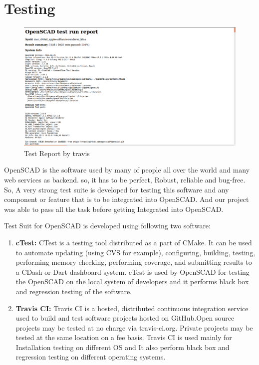 \section{Testing}
\begin{figure}[H]
    \centering
    \includegraphics[width=\linewidth]{images/travisTestReport}
    \caption{Test Report by travis}
    \label{fig:travisTestReport}
\end{figure}

OpenSCAD is the software used by many of people all over the world and many web services as backend. so, it has to be perfect, Robust, reliable and bug-free. So, A very strong test suite is developed for testing this software and any component or feature that is to be integrated into OpenSCAD. And our project was able to pass all the task before getting Integrated into OpenSCAD.

Test Suit for OpenSCAD is developed using following two software:

\begin{enumerate}
    \item \textbf{cTest:} CTest is a testing tool distributed as a part of CMake. It can be used to automate updating (using CVS for example), configuring, building, testing, performing memory checking, performing coverage, and submitting results to a CDash or Dart dashboard system.
    cTest is used by OpenSCAD for testing the OpenSCAD on the local system of developers and it performs black box and regression testing of the software.
   
    \item \textbf{Travis CI:} Travis CI is a hosted, distributed continuous integration service used to build and test software projects hosted on GitHub.Open source projects may be tested at no charge via travis-ci.org. Private projects may be tested at the same location on a fee basis.
    Travis CI is used mainly for Installation testing on different OS and It also perform  black box and regression testing on different operating systems.
   
\end{enumerate}


